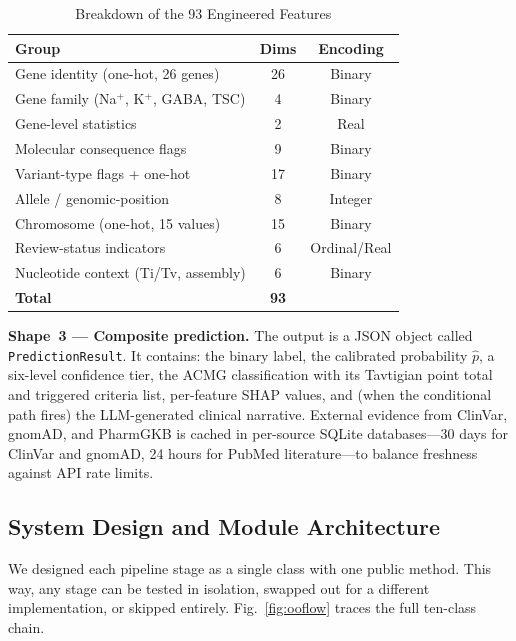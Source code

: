 \documentclass[conference]{IEEEtran}
\begin{document}
\begin{table}[!htb]
\caption{Breakdown of the 93 Engineered Features}
\label{tab:featuregroups}
\begin{center}
\begin{tabular}{lcc}
\toprule
\textbf{Group} & \textbf{Dims} & \textbf{Encoding} \\
\midrule
Gene identity (one-hot, 26 genes)             & 26 & Binary \\
Gene family (Na$^+$, K$^+$, GABA, TSC)       &  4 & Binary \\
Gene-level statistics                         &  2 & Real \\
Molecular consequence flags                   &  9 & Binary \\
Variant-type flags + one-hot                  & 17 & Binary \\
Allele / genomic-position                     &  8 & Integer \\
Chromosome (one-hot, 15 values)               & 15 & Binary \\
Review-status indicators                      &  6 & Ordinal/Real \\
Nucleotide context (Ti/Tv, assembly)          &  6 & Binary \\
\midrule
\textbf{Total}                                & \textbf{93} & \\
\bottomrule
\end{tabular}
\end{center}
\end{table}

\textbf{Shape~3 --- Composite prediction.}
The output is a JSON object called \texttt{PredictionResult}. It
contains: the binary label, the calibrated probability $\hat{p}$,
a six-level confidence tier, the ACMG classification with its
Tavtigian point total and triggered criteria list, per-feature SHAP
values, and (when the conditional path fires) the LLM-generated
clinical narrative. External evidence from ClinVar, gnomAD, and
PharmGKB is cached in per-source SQLite databases---30 days for
ClinVar and gnomAD, 24 hours for PubMed literature---to balance
freshness against API rate limits.

\subsection{System Design and Module Architecture}

We designed each pipeline stage as a single class with one public
method. This way, any stage can be tested in isolation, swapped out
for a different implementation, or skipped entirely.
Fig.~\ref{fig:ooflow} traces the full ten-class chain.
\end{document}
